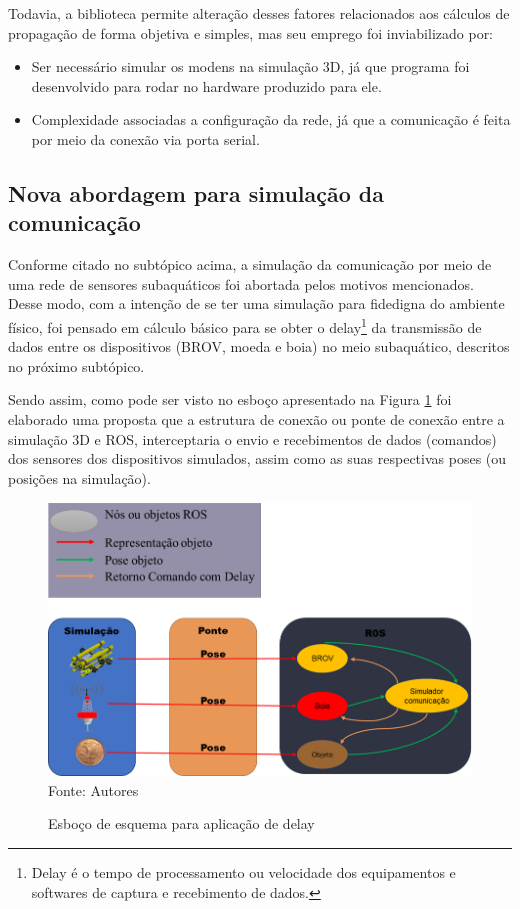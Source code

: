 Todavia, a biblioteca permite alteração desses fatores relacionados aos cálculos de propagação de forma objetiva e simples, mas seu emprego foi inviabilizado por:

\begin{itemize}
	\item Ser necessário simular os modens na simulação 3D, já que programa foi desenvolvido para rodar no hardware produzido para ele.
	\item Complexidade associadas a configuração da rede, já que a comunicação é feita por meio da conexão via porta serial.
\end{itemize}




\subsection{Nova abordagem para simulação da comunicação}

Conforme citado no subtópico acima, a simulação da comunicação por meio de uma rede de sensores subaquáticos foi abortada pelos motivos mencionados. Desse modo, com a intenção de se ter uma simulação para fidedigna do ambiente físico, foi pensado em cálculo básico para se obter o delay\footnote{Delay é o tempo de processamento ou velocidade dos equipamentos e softwares de captura e recebimento de dados.}  da transmissão de dados entre os dispositivos (BROV, moeda e boia) no meio subaquático, descritos no próximo subtópico.

Sendo assim, como pode ser visto no esboço apresentado na Figura \ref{fig:aplicacao-delay} foi elaborado uma proposta que a estrutura de conexão ou ponte de conexão entre a simulação 3D e ROS, interceptaria o envio e recebimentos de dados (comandos) dos sensores dos dispositivos simulados, assim como as suas respectivas poses (ou posições na simulação).

\begin{figure}[h]
	\centering
	\caption[Esboço de esquema para aplicação de delay]{Esboço de esquema para aplicação de delay}
	\label{fig:aplicacao-delay}
	\includegraphics[width=0.8\linewidth]{images/aplicacao-delay}\\
	\footnotesize Fonte: Autores
\end{figure}



